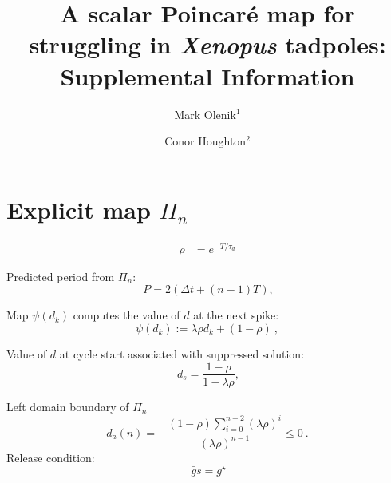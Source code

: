 \documentclass[12pt,authoryear]{elsarticle}
\begin{document}
\begin{frontmatter}

\title{A scalar Poincaré map for struggling in \textit{Xenopus} tadpoles: Supplemental Information}

\author{Mark Olenik$^{1}$}
\address{$^{1}$School of Biological Sciences, University of Bristol, Bristol BS81TQ, United Kingdom}
\author{Conor Houghton$^{2}$}
\address{$^{2}$School of Computer Science, Electrical and Electronic Engineering, and Engineering Mathematics, University of Bristol, Bristol BS81UB, United Kingdom}

\end{frontmatter}

\section{Explicit map $\Pi_{n}$}

\begin{align}
  \rho &= e^{-T/\tau_{d}}
\end{align}


\noindent
Predicted period from $\Pi_{n}$:
\begin{equation}
 ~\label{eq:P}
  P=2(\Delta t + (n-1)T),
\end{equation}

\noindent
Map $\psi(d_{k})$ computes the value of $d$ at the next spike:
\begin{equation}
  \psi(d_{k}):= \lambda\rho d_{k} + (1-\rho)~\label{eq:map-d},
\end{equation}

\noindent
Value of $d$ at cycle start associated with suppressed solution:
\begin{equation}
 ~\label{eq:dsup}
  d_{s}=\frac{1-\rho}{1-\lambda\rho},
\end{equation}

\noindent
Left domain boundary of $\Pi_{n}$
\begin{equation}
  d_{a}(n)=-\frac{(1-\rho)\sum_{i=0}^{n-2}(\lambda \rho)^{i}}{ (\lambda \rho)^{n-1} }\leq 0~\label{eq:da}.
\end{equation}
Release condition:
\begin{equation}
 ~\label{eq:release}
  \bar gs=g^{\star}
\end{equation}
\end{document}
